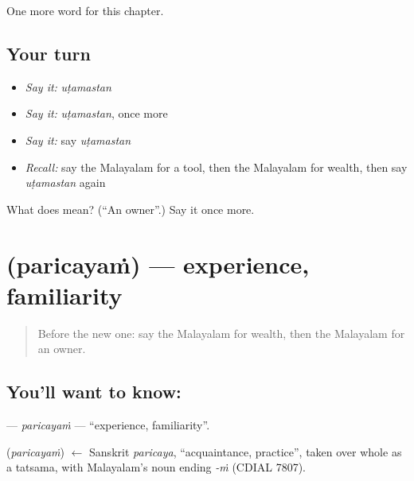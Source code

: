 \begin{grammarlens}[title={What you've built}]
One more word for this chapter.
\end{grammarlens}

\subsection*{Your turn}
\begin{itemize}
\raggedright
  \item \emph{Say it:} \emph{uṭamastan}
  \item \emph{Say it:} \emph{uṭamastan}, once more
  \item \emph{Say it:} say \emph{uṭamastan}
  \item \emph{Recall:} say the Malayalam for a tool, then the Malayalam for wealth, then say \emph{uṭamastan} again
\end{itemize}

\begin{tcolorbox}[breakable,colback=teal!4,colframe=teal!35!black,title={Before you move on}]
What does  mean? (\textquotedblleft{}An owner\textquotedblright{}.) Say it once more.
\end{tcolorbox}
\section[\texorpdfstring{\ml{പരിചയം} (paricayaṁ)}{പരിചയം (paricayaṁ)}]{ (paricayaṁ) — experience, familiarity}

\label{lesson:ML-C143-paricayam}



\begin{quote}
Before the new one: say the Malayalam for wealth, then the Malayalam for an owner.
\end{quote}

\subsection*{You'll want to know: }
\textbf{} — \emph{paricayaṁ} — \textquotedblleft{}experience, familiarity\textquotedblright{}.

\begin{cousinweb}
\textbf{} (\emph{paricayaṁ}) $\leftarrow$ Sanskrit \emph{paricaya}, \textquotedblleft{}acquaintance, practice\textquotedblright{}, taken over whole as a tatsama, with Malayalam's noun ending \emph{-ṁ} (CDIAL 7807).
\end{cousinweb}

